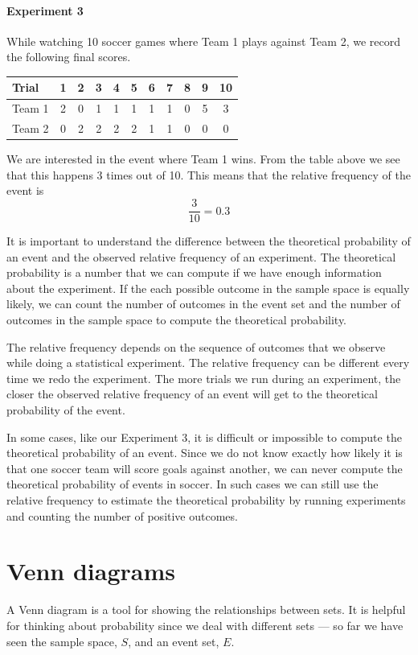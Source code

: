 \documentclass[a4paper,11pt]{report}
\begin{document}
\paragraph{Experiment 3} While watching 10 soccer games where Team 1
plays against Team 2, we record the following final scores.
\begin{center}
\begin{tabular}{lcccccccccc}
  \toprule
  Trial  & 1 & 2 & 3 & 4 & 5 & 6 & 7 & 8 & 9 & 10 \\
  \midrule
  Team 1 & 2 & 0 & 1 & 1 & 1 & 1 & 1 & 0 & 5 & 3 \\
  Team 2 & 0 & 2 & 2 & 2 & 2 & 1 & 1 & 0 & 0 & 0 \\
  \bottomrule
\end{tabular}
\end{center}
We are interested in the event where Team 1 wins. From the table above
we see that this happens 3 times out of 10. This means that the
relative frequency of the event is
\[\frac{3}{10} = 0.3\]

It is important to understand the difference between the theoretical
probability of an event and the observed relative frequency of an
experiment. The theoretical probability is a number that we can
compute if we have enough information about the experiment. If the
each possible outcome in the sample space is equally likely, we can
count the number of outcomes in the event set and the number of
outcomes in the sample space to compute the theoretical probability.

The relative frequency depends on the sequence of outcomes that we
observe while doing a statistical experiment. The relative frequency
can be different every time we redo the experiment. The more trials we
run during an experiment, the closer the observed relative frequency
of an event will get to the theoretical probability of the event.

In some cases, like our Experiment 3, it is difficult or impossible to
compute the theoretical probability of an event. Since we do not know
exactly how likely it is that one soccer team will score goals against
another, we can never compute the theoretical probability of events in
soccer. In such cases we can still use the relative frequency to
estimate the theoretical probability by running experiments and
counting the number of positive outcomes.

\section{Venn diagrams}
A Venn diagram is a tool for showing the relationships between
sets. It is helpful for thinking about probability since we deal with
different sets --- so far we have seen the sample space, $S$, and an
event set, $E$.
\end{document}
